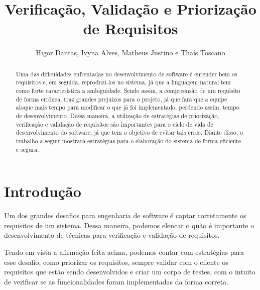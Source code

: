 \documentclass[runningheads]{llncs}
\begin{document}
%
\title{Verificação, Validação e Priorização de Requisitos}
%
\author{Higor Dantas,
Ivyna Alves, Matheus Justino e
Thaís Toscano}
%
%
%
\maketitle              %
%
\begin{abstract}
Uma das dificuldades enfrentadas no desenvolvimento de software é entender bem os requisitos e, em seguida, reproduzi-los no sistema, já que a linguagem natural tem como forte característica a ambiguidade. Sendo assim, a compreensão de um requisito de forma errônea, traz grandes prejuízos para o projeto, já que fará que a equipe aloque mais tempo para modificar o que já foi implementado, perdendo assim, tempo de desenvolvimento. Dessa maneira, a utilização de estratégias de priorização, verificação e validação de requisitos são importantes para o ciclo de vida de desenvolvimento do software, já que tem o objetivo de evitar tais erros. Diante disso, o trabalho a seguir mostrará estratégias para o elaboração do sistema de forma eficiente e segura.

\end{abstract}
%
%
%
\section{Introdução}
Um dos grandes desafios para engenharia de software é captar corretamente os requisitos de um sistema. Dessa maneira, podemos elencar o quão é importante o desenvolvimento de técnicas para verificação e validação de requisitos.

Tendo em vista a afirmação feita acima, podemos contar com estratégias para esse desafio, como priorizar os requisitos, sempre validar com o cliente os requisitos que estão sendo desenvolvidos e criar um corpo de testes, com o intuito de verificar se as funcionalidades foram implementadas da forma correta.
\end{document}
